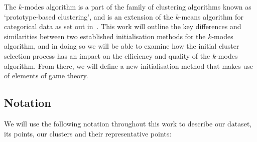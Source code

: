 The \(k\)-modes algorithm is a part of the family of clustering algorithms known
as `prototype-based clustering', and is an extension of the \(k\)-means 
algorithm for categorical data as set out in~\cite{Huang98}. This work will 
outline the key differences and similarities between two established
initialisation methods for the \(k\)-modes algorithm, and in doing so we will be
able to examine how the initial cluster selection process has an impact on the 
efficiency and quality of the \(k\)-modes algorithm. From there, we will define
a new initialisation method that makes use of elements of game theory.\\


\subsection{Notation}\label{subsec:notation}

We will use the following notation throughout this work to describe our dataset,
its points, our clusters and their representative points:

